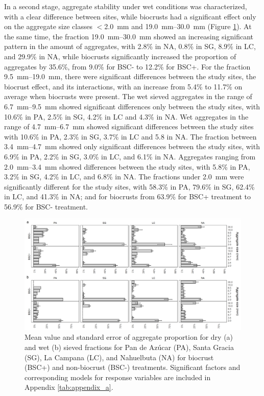 In a second stage, aggregate stability under wet conditions was characterized, with a clear difference between sites, while biocrusts had a significant effect only on the aggregate size classes $<$\SI{2.0}{\milli\meter} and \SIrange[range-phrase=--,range-units=single]{19.0}{30.0}{\milli\meter} (Figure \ref{fig:M1-F3}). At the same time, the fraction \SIrange[range-phrase=--,range-units=single]{19.0}{30.0}{\milli\meter} showed an increasing significant pattern in the amount of aggregates, with 2.8\% in NA, 0.8\% in SG, 8.9\% in LC, and 29.9\% in NA, while biocrusts significantly increased the proportion of aggregates by 35.6\%, from 9.0\% for BSC- to 12.2\% for BSC+. For the fraction \SIrange[range-phrase=--,range-units=single]{9.5}{19.0}{\milli\meter}, there were significant differences between the study sites, the biocrust effect, and its interactions, with an increase from 5.4\% to 11.7\% on average when biocrusts were present. The wet sieved aggregates in the range of \SIrange[range-phrase=--,range-units=single]{6.7}{9.5}{\milli\meter} showed significant differences only between the study sites, with 10.6\% in PA, 2.5\% in SG, 4.2\% in LC and 4.3\% in NA. Wet aggregates in the range of \SIrange[range-phrase=--,range-units=single]{4.7}{6.7}{\milli\meter} showed significant differences between the study sites with 10.6\% in PA, 2.3\% in SG, 3.7\% in LC and 5.8 in NA. The fraction between \SIrange[range-phrase=--,range-units=single]{3.4}{4.7}{\milli\meter} showed only significant differences between the study sites, with 6.9\% in PA, 2.2\% in SG, 3.0\% in LC, and 6.1\% in NA. Aggregates ranging from \SIrange[range-phrase=--,range-units=single]{2.0}{3.4}{\milli\meter} showed differences between the study sites, with 5.8\% in PA, 3.2\% in SG, 4.2\% in LC, and 6.8\% in NA. The fractions under \SI{2.0}{\milli\meter} were significantly different for the study sites, with 58.3\% in PA, 79.6\% in SG, 62.4\% in LC, and 41.3\% in NA; and for biocrusts from 63.9\% for BSC+ treatment to 56.9\% for BSC- treatment.

\begin{figure}[H]
	\centering
	\includegraphics[width=1\textwidth]{img/M1-Figure_3.png}
	\caption{Mean value and standard error of aggregate proportion for dry (a) and wet (b) sieved fractions for Pan de Azúcar (PA), Santa Gracia (SG), La Campana (LC), and Nahuelbuta (NA) for biocrust (BSC+) and non-biocrust (BSC-) treatments. Significant factors and corresponding models for response variables are included in Appendix \ref{tab:appendix_a}.}
	\label{fig:M1-F3}
\end{figure}

